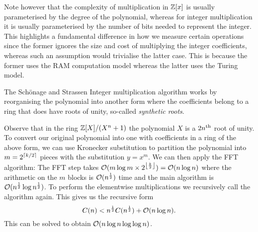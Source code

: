 \medskip

Note however that the complexity of multiplication in ${\mathbb Z}[x]$ is usually parameterised by the degree of the polynomial, whereas for integer multiplication it is usually parameterised by the number of bits needed to represent the integer. This highlights a fundamental difference in how we measure certain operations since the former ignores the size and cost of multiplying the integer coefficients, whereas such an assumption would trivialise the latter case. This is because the former uses the RAM computation model whereas the latter uses the Turing model. 

The Sch\"{o}nage and Strassen Integer multiplication algorithm works by reorganising the polynomial into another form where the coefficients belong to a ring that does have roots of unity, so-called \emph{synthetic roots}.

Observe that in the ring ${\mathbb Z}[X] / (X^n + 1)$ the polynomial $X$ is a $2n^{\textrm{th}}$ root of unity. To convert our original polynomial into one with coefficients in a ring of the above form, we can use Kronecker substitution to partition the polynomial into $m = 2^{\left \lceil k/2 \right \rceil}$ pieces with the substitution $y = x^m$. We can then apply the FFT algorithm: The FFT step takes $\mathcal O(m\log m \times 2^{\left \lfloor \frac{k}{2} \right \rfloor}) = \mathcal O(n \log n)$ where the arithmetic on the $m$ blocks is $\mathcal O(n^{\frac{1}{2}})$ time and the main algorithm is $\mathcal O(n^{\frac{1}{2}}\log n^{\frac{1}{2}})$. To perform the elementwise multiplications we recursively call the algorithm again. This gives us the recursive form
\[
    C(n) < n^{\frac{1}{2}}C(n^{\frac{1}{2}}) + \mathcal O(n \log n).
\]
This can be solved to obtain $\mathcal O(n \log n \log \log n)$.




